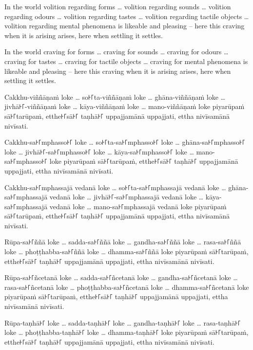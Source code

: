 In the world volition regarding forms \ldots{} volition regarding sounds
\ldots{} volition regarding odours \ldots{} volition regarding tastes \ldots{}
volition regarding tactile objects \ldots{} volition regarding mental phenomena
is likeable and pleasing -- here this craving when it is arising arises, here
when settling it settles.

In the world craving for forms \ldots{} craving for sounds \ldots{} craving for
odours \ldots{} craving for tastes \ldots{} craving for tactile objects \ldots{}
craving for mental phenomena is likeable and pleasing -- here this craving when
it is arising arises, here when settling it settles.

\paliPage

Cakkhu-viññāṇaṁ loke \ldots{} so꜔꜒ta-viññāṇaṁ loke \ldots{} ghāna-viññāṇaṁ loke
\ldots{} jivhā꜔꜒-viññāṇaṁ loke \ldots{} kāya-viññāṇaṁ loke \ldots{} mano-viññāṇaṁ
loke piyarūpaṁ sā꜔꜒tarūpaṁ, etthe꜔꜒sā꜔꜒ taṇhā꜔꜒ uppajjamānā uppajjati, ettha nivīsamānā
nivīsati.

Cakkhu-sa꜔꜒mphasso꜔꜒ loke \ldots{} so꜔꜒ta-sa꜔꜒mphasso꜔꜒ loke \ldots{} ghāna-sa꜔꜒mphasso꜔꜒ loke
\ldots{} jivhā꜔꜒-sa꜔꜒mphasso꜔꜒ loke \ldots{} kāya-sa꜔꜒mphasso꜔꜒ loke \ldots{} mano-sa꜔꜒mphasso꜔꜒
loke piyarūpaṁ sā꜔꜒tarūpaṁ, etthe꜔꜒sā꜔꜒ taṇhā꜔꜒ uppajjamānā uppajjati, ettha nivīsamānā
nivīsati.

Cakkhu-sa꜔꜒mphassajā vedanā loke \ldots{} so꜔꜒ta-sa꜔꜒mphassajā vedanā loke \ldots{}
ghāna-sa꜔꜒mphassajā vedanā loke \ldots{} jivhā꜔꜒-sa꜔꜒mphassajā vedanā loke \ldots{}
kāya-sa꜔꜒mphassajā vedanā loke \ldots{} mano-sa꜔꜒mphassajā vedanā loke piyarūpaṁ
sā꜔꜒tarūpaṁ, etthe꜔꜒sā꜔꜒ taṇhā꜔꜒ uppajjamānā uppajjati, ettha nivīsamānā nivīsati.

Rūpa-sa꜔꜒ññā loke \ldots{} sadda-sa꜔꜒ññā loke \ldots{} gandha-sa꜔꜒ññā loke \ldots{}
rasa-sa꜔꜒ññā loke \ldots{} phoṭṭhabba-sa꜔꜒ññā loke \ldots{} dhamma-sa꜔꜒ññā loke piyarūpaṁ
sā꜔꜒tarūpaṁ, etthe꜔꜒sā꜔꜒ taṇhā꜔꜒ uppajjamānā uppajjati, ettha nivīsamānā nivīsati.

Rūpa-sa꜔꜒ñcetanā loke \ldots{} sadda-sa꜔꜒ñcetanā loke \ldots{} gandha-sa꜔꜒ñcetanā loke
\ldots{} rasa-sa꜔꜒ñcetanā loke \ldots{} phoṭṭhabba-sa꜔꜒ñcetanā loke \ldots{}
dhamma-sa꜔꜒ñcetanā loke piyarūpaṁ sā꜔꜒tarūpaṁ, etthe꜔꜒sā꜔꜒ taṇhā꜔꜒ uppajjamānā uppajjati,
ettha nivīsamānā nivīsati.

Rūpa-taṇhā꜔꜒ loke \ldots{} sadda-taṇhā꜔꜒ loke \ldots{} gandha-taṇhā꜔꜒ loke \ldots{}
rasa-taṇhā꜔꜒ loke \ldots{} phoṭṭhabba-taṇhā꜔꜒ loke \ldots{} dhamma-taṇhā꜔꜒ loke piyarūpaṁ
sā꜔꜒tarūpaṁ, etthe꜔꜒sā꜔꜒ taṇhā꜔꜒ uppajjamānā uppajjati, ettha nivīsamānā nivīsati.

